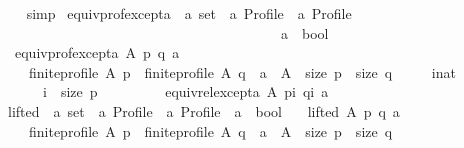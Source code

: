 \begin{isabellebody}
%
\isadelimproof
\ \ %
\endisadelimproof
%
\isatagproof
{}\isamarkupfalse%
\ simp%
\endisatagproof
{\isafoldproof}%
%
\isadelimproof
%
\endisadelimproof
%
\isadelimdocument
%
\endisadelimdocument
%
\isatagdocument
%
\isamarkuptrue%
%
\endisatagdocument
{\isafolddocument}%
%
\isadelimdocument
%
\endisadelimdocument
{}\isamarkupfalse%
\ equiv{\isacharunderscore}{\kern0pt}prof{\isacharunderscore}{\kern0pt}except{\isacharunderscore}{\kern0pt}a\ {\isacharcolon}{\kern0pt}{\isacharcolon}{\kern0pt}\ {\isachardoublequoteopen}{\isacharprime}{\kern0pt}a\ set\ {\isasymRightarrow}\ {\isacharprime}{\kern0pt}a\ Profile\ {\isasymRightarrow}\ {\isacharprime}{\kern0pt}a\ Profile\ {\isasymRightarrow}\isanewline
\ \ \ \ \ \ \ \ \ \ \ \ \ \ \ \ \ \ \ \ \ \ \ \ \ \ \ \ \ \ \ \ \ \ \ \ \ \ \ \ {\isacharprime}{\kern0pt}a\ {\isasymRightarrow}\ bool{\isachardoublequoteclose}\ \isanewline
\ \ {\isachardoublequoteopen}equiv{\isacharunderscore}{\kern0pt}prof{\isacharunderscore}{\kern0pt}except{\isacharunderscore}{\kern0pt}a\ A\ p\ q\ a\ {\isasymequiv}\isanewline
\ \ \ \ finite{\isacharunderscore}{\kern0pt}profile\ A\ p\ {\isasymand}\ finite{\isacharunderscore}{\kern0pt}profile\ A\ q\ {\isasymand}\ a\ {\isasymin}\ A\ {\isasymand}\ size\ p\ {\isacharequal}{\kern0pt}\ size\ q\ {\isasymand}\isanewline
\ \ \ \ {\isacharparenleft}{\kern0pt}{\isasymforall}i{\isacharcolon}{\kern0pt}{\isacharcolon}{\kern0pt}nat{\isachardot}{\kern0pt}\isanewline
\ \ \ \ \ \ i\ {\isacharless}{\kern0pt}\ size\ p\ {\isasymlongrightarrow}\isanewline
\ \ \ \ \ \ \ \ equiv{\isacharunderscore}{\kern0pt}rel{\isacharunderscore}{\kern0pt}except{\isacharunderscore}{\kern0pt}a\ A\ {\isacharparenleft}{\kern0pt}p{\isacharbang}{\kern0pt}i{\isacharparenright}{\kern0pt}\ {\isacharparenleft}{\kern0pt}q{\isacharbang}{\kern0pt}i{\isacharparenright}{\kern0pt}\ a{\isacharparenright}{\kern0pt}{\isachardoublequoteclose}\isanewline
\isanewline
\isanewline
{}\isamarkupfalse%
\ lifted\ {\isacharcolon}{\kern0pt}{\isacharcolon}{\kern0pt}\ {\isachardoublequoteopen}{\isacharprime}{\kern0pt}a\ set\ {\isasymRightarrow}\ {\isacharprime}{\kern0pt}a\ Profile\ {\isasymRightarrow}\ {\isacharprime}{\kern0pt}a\ Profile\ {\isasymRightarrow}\ {\isacharprime}{\kern0pt}a\ {\isasymRightarrow}\ bool{\isachardoublequoteclose}\ \isanewline
\ \ {\isachardoublequoteopen}lifted\ A\ p\ q\ a\ {\isasymequiv}\isanewline
\ \ \ \ finite{\isacharunderscore}{\kern0pt}profile\ A\ p\ {\isasymand}\ finite{\isacharunderscore}{\kern0pt}profile\ A\ q\ {\isasymand}\ a\ {\isasymin}\ A\ {\isasymand}\ size\ p\ {\isacharequal}{\kern0pt}\ size\ q\ {\isasymand}\isanewline

\end{isabellebody}
